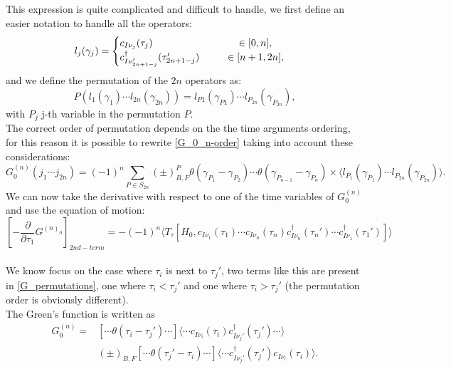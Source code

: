 \documentclass[12pt, a4paper]{report}
\numberwithin{equation}{section}
\begin{document}
This expression is quite complicated and difficult to handle, we first define an easier notation to handle all the operators:
\begin{equation}
    l_j(\gamma_j) = 
    \begin{cases}
        c_{I\nu_j}(\tau_j)\hspace{2.95cm}\in[0,n], \\
        c^\dagger_{I\nu_{2n+1-j}'}(\tau_{2n+1-j}')\hspace{0.9cm}\in[n+1,2n],
    \end{cases}
    \label{eq:signfunction}
\end{equation}
and we define the permutation of the $2n$ operators as:
\begin{equation}
    P(l_1(\gamma_1)\cdots l_{2n}(\gamma_{2n}))=l_{P1}(\gamma_{P1})\cdots l_{P_{2n}}(\gamma_{P_{2n}}),
\end{equation}
with $P_j$ j-th variable in the permutation $P$.\\
The correct order of permutation depends on the the time arguments ordering, for this reason it is possible to rewrite \ref{G_0_n-order} 
taking into account these considerations:
\begin{equation}
        G^{(n)}_0(j_1\cdots j_{2n})=(-1)^n\sum_{P\in S_{2n}}(\pm)^{P}_{B,F}\theta(\gamma_{P_1}-\gamma_{P_2})\cdots\theta(\gamma_{P_{n-1}}-\gamma_{P_n})\times\langle l_{P_1}(\gamma_{P_1})\cdots l_{P_{2n}}(\gamma_{P_{2n}})\rangle.
        \label{G_permutations}
\end{equation}
We can now take the derivative with respect to one of the time variables of $G^{(n)}_0$ and use the equation of motion:
\begin{equation}
    \left[-\frac{\partial}{\partial\tau_1}G^{(n)_0}\right]_{2nd-term}=-(-1)^n\langle T_\tau\left[H_0,c_{I\nu_1}(\tau_1)\cdots c_{I\nu_n}(\tau_n)c^\dagger_{I\nu_n}(\tau_n')\cdots c^\dagger_{I\nu_1}(\tau_1')\right]\rangle
\end{equation}
\\
We know focus on the case where $\tau_i$ is next to $\tau_j'$, two terms like this are present in \ref{G_permutations}, one where $\tau_i<\tau_j'$ and one where 
$\tau_i>\tau_j'$ (the permutation order is obviously different).\\
The Green's function is written as 
\begin{equation}
\begin{split}
    G_0^{(n)}=&\left[\cdots \theta(\tau_i-\tau_j')\cdots\right]\langle \cdots c_{I\nu_i}(\tau_i)c^\dagger_{I\nu_j'}(\tau_j')\cdots\rangle \\
    &(\pm)_{B,F}[\cdots \theta(\tau_j'-\tau_i)\cdots]\langle \cdots c^\dagger_{I\nu_j'}(\tau_j')c_{I\nu_i}(\tau_i)\rangle.
\end{split}
\end{equation}
\end{document}
